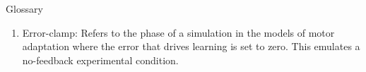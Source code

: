 \documentclass{report}
\begin{document}
\begin{chapter}{Glossary}
\begin{enumerate}
\item Error-clamp: Refers to the phase of a simulation in the models of motor adaptation where the error that drives learning is set to zero. This emulates a no-feedback experimental condition.
\end{enumerate}
\end{chapter}

\end{document}
